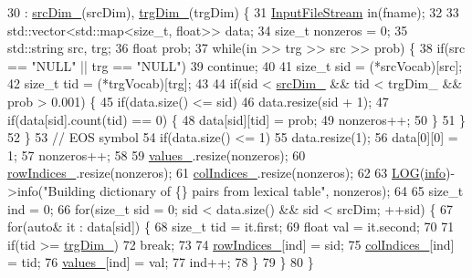 \begin{DoxyCode}
30       : \hyperlink{classmarian_1_1LexProbs_a066f91b5a18aa4e703d36b2e5583a1d5}{srcDim\_}(srcDim), \hyperlink{classmarian_1_1LexProbs_aca81dfd4fe0b8a08e499cfeab3115950}{trgDim\_}(trgDim) \{
31     \hyperlink{classInputFileStream}{InputFileStream} in(fname);
32 
33     std::vector<std::map<size\_t, float>> data;
34     \textcolor{keywordtype}{size\_t} nonzeros = 0;
35     std::string src, trg;
36     \textcolor{keywordtype}{float} prob;
37     \textcolor{keywordflow}{while}(in >> trg >> src >> prob) \{
38       \textcolor{keywordflow}{if}(src == \textcolor{stringliteral}{"NULL"} || trg == \textcolor{stringliteral}{"NULL"})
39         \textcolor{keywordflow}{continue};
40 
41       \textcolor{keywordtype}{size\_t} sid = (*srcVocab)[src];
42       \textcolor{keywordtype}{size\_t} tid = (*trgVocab)[trg];
43 
44       \textcolor{keywordflow}{if}(sid < \hyperlink{classmarian_1_1LexProbs_a066f91b5a18aa4e703d36b2e5583a1d5}{srcDim\_} && tid < trgDim\_ && prob > 0.001) \{
45         \textcolor{keywordflow}{if}(data.size() <= sid)
46           data.resize(sid + 1);
47         \textcolor{keywordflow}{if}(data[sid].count(tid) == 0) \{
48           data[sid][tid] = prob;
49           nonzeros++;
50         \}
51       \}
52     \}
53     \textcolor{comment}{// EOS symbol}
54     \textcolor{keywordflow}{if}(data.size() <= 1)
55       data.resize(1);
56     data[0][0] = 1;
57     nonzeros++;
58 
59     \hyperlink{classmarian_1_1LexProbs_a12c2b523b16a3239d99fd69a6a463927}{values\_}.resize(nonzeros);
60     \hyperlink{classmarian_1_1LexProbs_af0877c33d19bcec0d40e3cc99946d93b}{rowIndices\_}.resize(nonzeros);
61     \hyperlink{classmarian_1_1LexProbs_af46061a0c4104dce0c8da7d91f014f44}{colIndices\_}.resize(nonzeros);
62 
63     \hyperlink{amun_2common_2logging_8h_a8cad147aca8c526d3c8a03ae14d5c87d}{LOG}(\hyperlink{namespacefix__hard_a31eedbb056537bc1bef47ad5e40eaa68}{info})->info(\textcolor{stringliteral}{"Building dictionary of \{\} pairs from lexical table"}, nonzeros);
64 
65     \textcolor{keywordtype}{size\_t} ind = 0;
66     \textcolor{keywordflow}{for}(\textcolor{keywordtype}{size\_t} sid = 0; sid < data.size() && sid < srcDim; ++sid) \{
67       \textcolor{keywordflow}{for}(\textcolor{keyword}{auto}& it : data[sid]) \{
68         \textcolor{keywordtype}{size\_t} tid = it.first;
69         \textcolor{keywordtype}{float} val = it.second;
70 
71         \textcolor{keywordflow}{if}(tid >= \hyperlink{classmarian_1_1LexProbs_aca81dfd4fe0b8a08e499cfeab3115950}{trgDim\_})
72           \textcolor{keywordflow}{break};
73 
74         \hyperlink{classmarian_1_1LexProbs_af0877c33d19bcec0d40e3cc99946d93b}{rowIndices\_}[ind] = sid;
75         \hyperlink{classmarian_1_1LexProbs_af46061a0c4104dce0c8da7d91f014f44}{colIndices\_}[ind] = tid;
76         \hyperlink{classmarian_1_1LexProbs_a12c2b523b16a3239d99fd69a6a463927}{values\_}[ind] = val;
77         ind++;
78       \}
79     \}
80   \}
\end{DoxyCode}

